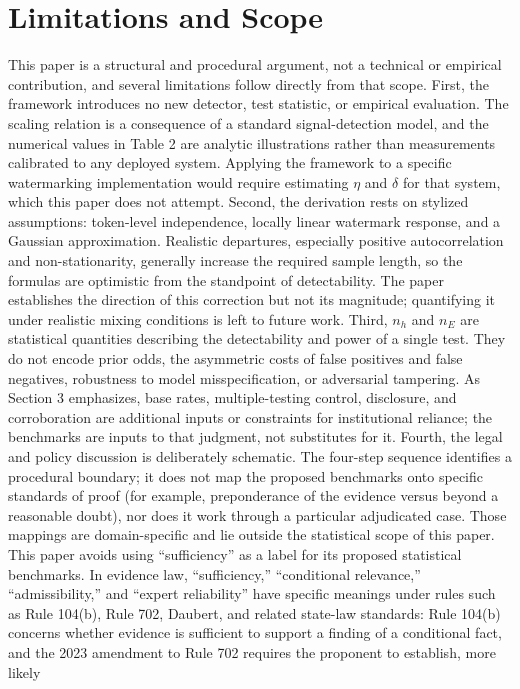 \documentclass[11pt]{article}
\begin{document}
\section{Limitations and Scope}
This paper is a structural and procedural argument, not a technical or empirical
contribution, and several limitations follow directly from that scope.
First, the framework introduces no new detector, test statistic, or empirical
evaluation. The scaling relation is a consequence of a standard signal-detection
model, and the numerical values in Table 2 are analytic illustrations rather than
measurements calibrated to any deployed system. Applying the framework to a specific
watermarking implementation would require estimating $\eta$ and $\delta$ for that
system, which this paper does not attempt.
Second, the derivation rests on stylized assumptions: token-level independence,
locally linear watermark response, and a Gaussian approximation. Realistic
departures, especially positive autocorrelation and non-stationarity, generally
increase the required sample length, so the formulas are optimistic from the
standpoint of detectability. The paper establishes the direction of this correction
but not its magnitude; quantifying it under realistic mixing conditions is left to
future work.
Third, $n_h$ and $n_E$ are statistical quantities describing the detectability and
power of a single test. They do not encode prior odds, the asymmetric costs of false
positives and false negatives, robustness to model misspecification, or adversarial
tampering. As Section 3 emphasizes, base rates, multiple-testing control, disclosure,
and corroboration are additional inputs or constraints for institutional reliance;
the benchmarks are inputs to that judgment, not substitutes for it.
Fourth, the legal and policy discussion is deliberately schematic. The four-step
sequence identifies a procedural boundary; it does not map the proposed benchmarks
onto specific standards of proof (for example, preponderance of the evidence versus
beyond a reasonable doubt), nor does it work through a particular adjudicated case.
Those mappings are domain-specific and lie outside the statistical scope of this
paper.
This paper avoids using ``sufficiency'' as a label for its proposed statistical
benchmarks. In evidence law, ``sufficiency,'' ``conditional relevance,''
``admissibility,'' and ``expert reliability'' have specific meanings under rules such
as Rule 104(b), Rule 702, Daubert, and related state-law standards: Rule 104(b)
concerns whether evidence is sufficient to support a finding of a conditional fact,
and the 2023 amendment to Rule 702 requires the proponent to establish, more likely
\end{document}

